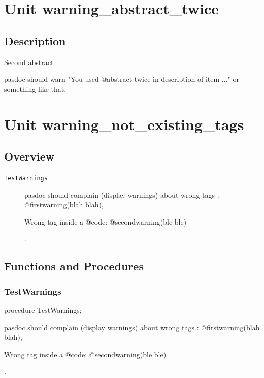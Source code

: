 \documentclass{report}
\begin{document}
\chapter{Unit warning{\_}abstract{\_}twice}
\section{Description}
Second abstract\hfill\vspace*{1ex}





pasdoc should warn "You used @abstract twice in description of item ..." or something like that.
\chapter{Unit warning{\_}not{\_}existing{\_}tags}
\section{Overview}
\begin{description}
\item[\texttt{TestWarnings}]pasdoc should complain (display warnings) about wrong tags : @firstwarning(blah blah), \begin{ttfamily}Wrong tag inside a @code: @secondwarning(ble ble)\end{ttfamily}.
\end{description}
\section{Functions and Procedures}
\subsection*{TestWarnings}
\begin{list}{}{
\setlength{\itemindent}{0cm}
\setlength{\listparindent}{0cm}
\setlength{\leftmargin}{\evensidemargin}
\addtolength{\leftmargin}{\tmplength}
\settowidth{\labelsep}{X}
\addtolength{\leftmargin}{\labelsep}
\setlength{\labelwidth}{\tmplength}
}
\begin{flushleft}
\item[\textbf{Declaration}\hfill]
\begin{ttfamily}
procedure TestWarnings;\end{ttfamily}


\end{flushleft}
\par
\item[\textbf{Description}]
pasdoc should complain (display warnings) about wrong tags : @firstwarning(blah blah), \begin{ttfamily}Wrong tag inside a @code: @secondwarning(ble ble)\end{ttfamily}.

\end{list}
\end{document}
